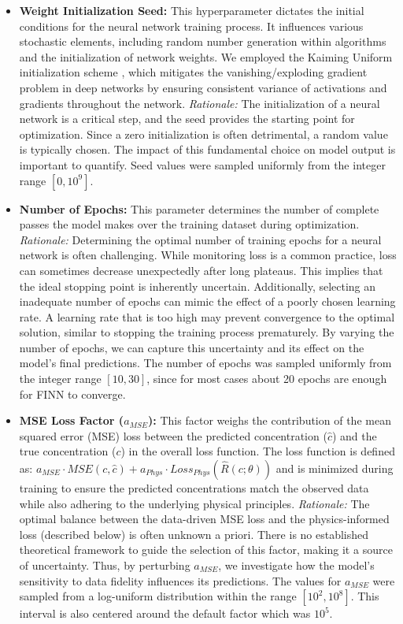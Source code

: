 \begin{itemize}
    \item \textbf{Weight Initialization Seed:} This hyperparameter dictates the initial conditions for the neural network training process. It influences various stochastic elements, including random number generation within algorithms and the initialization of network weights. We employed the Kaiming Uniform initialization scheme \cite{he2015delving}, which mitigates the vanishing/exploding gradient problem in deep networks by ensuring consistent variance of activations and gradients throughout the network. \textit{Rationale:} The initialization of a neural network is a critical step, and the seed provides the starting point for optimization. Since a zero initialization is often detrimental, a random value is typically chosen. The impact of this fundamental choice on model output is important to quantify. Seed values were sampled uniformly from the integer range $[0, 10^9]$.
    \item \textbf{Number of Epochs:} This parameter determines the number of complete passes the model makes over the training dataset during optimization. \textit{Rationale:} Determining the optimal number of training epochs for a neural network is often challenging. While monitoring loss is a common practice, loss can sometimes decrease unexpectedly after long plateaus. This implies that the ideal stopping point is inherently uncertain. Additionally, selecting an inadequate number of epochs can mimic the effect of a poorly chosen learning rate. A learning rate that is too high may prevent convergence to the optimal solution, similar to stopping the training process prematurely. By varying the number of epochs, we can capture this uncertainty and its effect on the model's final predictions. The number of epochs was sampled uniformly from the integer range $[10, 30]$, since for most cases about 20 epochs are enough for FINN to converge.
    \item \textbf{MSE Loss Factor ($a_{MSE}$):} This factor weighs the contribution of the mean squared error (MSE) loss between the predicted concentration ($\hat{c}$) and the true concentration ($c$) in the overall loss function. The loss function is defined as: $a_{MSE} \cdot MSE(c, \hat{c}) + a_{Phys} \cdot Loss_{Phys}(\hat{R}(c;\theta))$ and is minimized during training to ensure the predicted concentrations match the observed data while also adhering to the underlying physical principles. \textit{Rationale:} The optimal balance between the data-driven MSE loss and the physics-informed loss (described below) is often unknown a priori. There is no established theoretical framework to guide the selection of this factor, making it a source of uncertainty. Thus, by perturbing $a_{MSE}$, we investigate how the model's sensitivity to data fidelity influences its predictions. The values for $a_{MSE}$ were sampled from a log-uniform distribution within the range $[10^2, 10^8]$. This interval is also centered around the default factor which was $10^5$.

\end{itemize}
